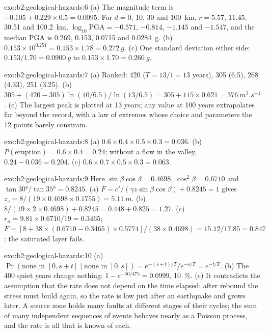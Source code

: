 \begin{solution}{exo:b2:geological-hazards:6}
(a) The magnitude term is $-0.105 + 0.229 \times 0.5 = 0.0095$. For $d = 0$, 10, 30 and
\qty{100}{km}, $r = 5.57$, 11.45, 30.51 and \qty{100.2}{km}, $\log_{10}\mathrm{PGA} = -0.571$,
$-0.814$, $-1.145$ and $-1.547$, and the median PGA is 0.269, 0.153, 0.0715 and \qty{0.0284}{g}.
(b) $0.153 \times 10^{0.251} = 0.153 \times 1.78 = \qty{0.272}{g}$. (c) One standard deviation
either side: $0.153/1.70 = \qty{0.0900}{g}$ to $0.153 \times 1.70 = \qty{0.260}{g}$.
\end{solution}

\begin{solution}{exo:b2:geological-hazards:7}
(a) Ranked: 420 ($T = 13/1 = 13$ years), 305 (6.5), 268 (4.33), 251 (3.25). (b) $305 + (420 -
305)\ln(10/6.5)/\ln(13/6.5) = 305 + 115 \times 0.621 = \qty{376}{m^3.s^{-1}}$. (c) The largest peak
is plotted at 13 years; any value at 100 years extrapolates far beyond the record, with a law of
extremes whose choice and parameters the 12 points barely constrain.
\end{solution}

\begin{solution}{exo:b2:geological-hazards:8}
(a) $0.6 \times 0.4 \times 0.5 \times 0.3 = 0.036$. (b) $P(\text{eruption}) = 0.6 \times 0.4 = 0.24$;
without a flow in the valley, $0.24 - 0.036 = 0.204$. (c) $0.6 \times 0.7 \times 0.5 \times 0.3 =
0.063$.
\end{solution}

\begin{solution}{exo:b2:geological-hazards:9}
Here $\sin\beta\cos\beta = 0.4698$, $\cos^2\beta = 0.6710$ and $\tan\ang{30}/\tan\ang{35} =
0.8245$. (a) $F = c'/(\gamma z\sin\beta\cos\beta) + 0.8245 = 1$ gives $z_c = 8/(19 \times 0.4698
\times 0.1755) = \qty{5.11}{m}$. (b) $8/(19 \times 2 \times 0.4698) + 0.8245 = 0.448 + 0.825 =
1.27$. (c) $r_u = 9.81 \times 0.6710/19 = 0.3465$; $F = [8 + 38 \times (0.6710 - 0.3465) \times
0.5774]/(38 \times 0.4698) = 15.12/17.85 = 0.847$: the saturated layer fails.
\end{solution}

\begin{solution}{exo:b2:geological-hazards:10}
(a) $\Pr(\text{none in } [0, s+t] \mid \text{none in } [0, s]) = e^{-(s+t)/T}/e^{-s/T} = e^{-t/T}$.
(b) The 400 quiet years change nothing: $1 - e^{-50/475} = 0.0999$, \qty{10}{\percent}. (c) It
contradicts the assumption that the rate does not depend on the time elapsed: after rebound the
stress must build again, so the rate is low just after an earthquake and grows later. A source
zone holds many faults at different stages of their cycles; the sum of many independent sequences
of events behaves nearly as a Poisson process, and the rate is all that is known of each.
\end{solution}

